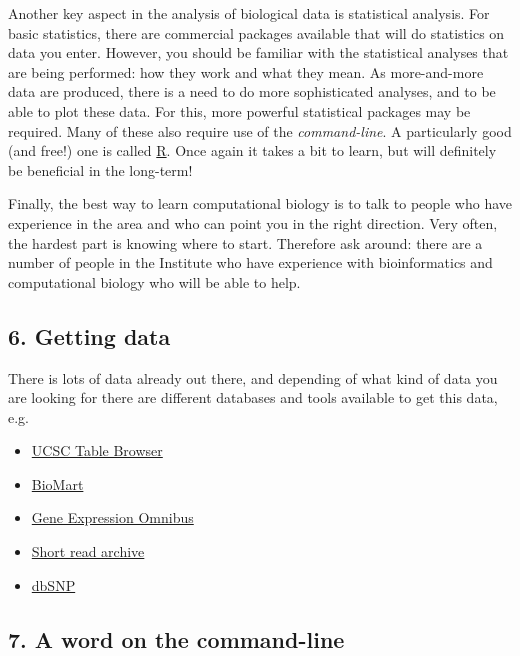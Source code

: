 \documentclass[]{article}
\begin{document}
Another key aspect in the analysis of biological data is statistical
analysis. For basic statistics, there are commercial packages available
that will do statistics on data you enter. However, you should be
familiar with the statistical analyses that are being performed: how
they work and what they mean. As more-and-more data are produced, there
is a need to do more sophisticated analyses, and to be able to plot
these data. For this, more powerful statistical packages may be
required. Many of these also require use of the \emph{command-line}. A
particularly good (and free!) one is called
\href{http://www.r-project.org/}{R}. Once again it takes a bit to learn,
but will definitely be beneficial in the long-term!

Finally, the best way to learn computational biology is to talk to
people who have experience in the area and who can point you in the
right direction. Very often, the hardest part is knowing where to start.
Therefore ask around: there are a number of people in the Institute who
have experience with bioinformatics and computational biology who will
be able to help.

\subsection{6. Getting data}\label{getting-data}

There is lots of data already out there, and depending of what kind of
data you are looking for there are different databases and tools
available to get this data, e.g.

\begin{itemize}
\itemsep1pt\parskip0pt
\item
  \href{http://genome.ucsc.edu/cgi-bin/hgTables?command=start}{UCSC
  Table Browser}
\item
  \href{http://www.biomart.org/biomart/martview/}{BioMart}
\item
  \href{http://www.ncbi.nlm.nih.gov/geo/}{Gene Expression Omnibus}
\item
  \href{http://www.ncbi.nlm.nih.gov/sra}{Short read archive}
\item
  \href{http://www.ncbi.nlm.nih.gov/snp/}{dbSNP}
\end{itemize}

\subsection{7. A word on the
command-line}\label{a-word-on-the-command-line}
\end{document}
